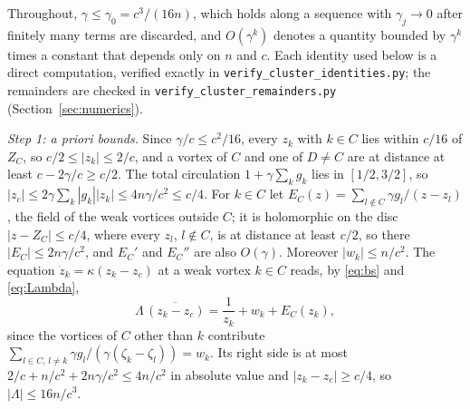 \documentclass[11pt]{article}
\theoremstyle{definition}
\begin{document}
Throughout, $\gamma \le \gamma_0 = c^3/(16n)$, which holds along a sequence with $\gamma_j \to 0$ after finitely many terms are discarded, and $O(\gamma^k)$ denotes a quantity bounded by $\gamma^k$ times a constant that depends only on $n$ and $c$. Each identity used below is a direct computation, verified exactly in \texttt{verify\_\allowbreak cluster\_\allowbreak identities.py}; the remainders are checked in \texttt{verify\_\allowbreak cluster\_\allowbreak remainders.py} (Section~\ref{sec:numerics}).

\emph{Step 1: a priori bounds.} Since $\gamma/c \le c^2/16$, every $z_k$ with $k \in C$ lies within $c/16$ of $Z_C$, so $c/2 \le |z_k| \le 2/c$, and a vortex of $C$ and one of $D \ne C$ are at distance at least $c - 2\gamma/c \ge c/2$. The total circulation $1 + \gamma\sum_k g_k$ lies in $[1/2, 3/2]$, so $|z_c| \le 2\gamma\sum_k |g_k||z_k| \le 4n\gamma/c^2 \le c/4$. For $k \in C$ let $E_C(z) = \sum_{l \notin C} \gamma g_l/(z - z_l)$, the field of the weak vortices outside $C$; it is holomorphic on the disc $|z - Z_C| \le c/4$, where every $z_l$, $l \notin C$, is at distance at least $c/2$, so there $|E_C| \le 2n\gamma/c^2$, and $E_C'$ and $E_C''$ are also $O(\gamma)$. Moreover $|w_k| \le n/c^2$. The equation $\dot z_k = \kappa(z_k - z_c)$ at a weak vortex $k \in C$ reads, by \eqref{eq:bs} and \eqref{eq:Lambda},
\begin{equation}\label{eq:weak}
  \Lambda\,\overline{(z_k - z_c)} = \frac{1}{z_k} + w_k + E_C(z_k),
\end{equation}
since the vortices of $C$ other than $k$ contribute $\sum_{l \in C,\, l \ne k} \gamma g_l/(\gamma(\zeta_k - \zeta_l)) = w_k$. Its right side is at most $2/c + n/c^2 + 2n\gamma/c^2 \le 4n/c^2$ in absolute value and $|z_k - z_c| \ge c/4$, so $|\Lambda| \le 16n/c^3$.
\end{document}
